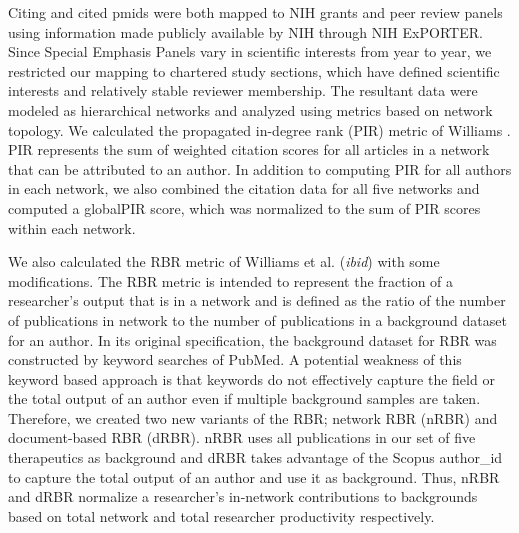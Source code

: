 \documentclass[10pt,letterpaper]{article}
\begin{document}
Citing and cited pmids were both mapped to NIH grants and peer review panels using information made publicly available by NIH through NIH ExPORTER. Since Special Emphasis Panels vary in scientific interests from year to year, we restricted our mapping to chartered study sections, which have defined scientific interests and relatively stable reviewer membership. The resultant data were modeled as hierarchical networks and analyzed using metrics based on network topology. We calculated the propagated in-degree rank (PIR) metric of Williams \cite {bib1}. PIR represents the sum of weighted citation scores for all articles in a network that can be attributed to an author. In addition to computing PIR for all authors in each network, we also combined the citation data for all five networks and computed a globalPIR score, which was normalized to the sum of PIR scores within each network.

We also calculated the RBR metric of Williams et al. (\textit{ibid}) with some modifications. The RBR metric is intended to represent the fraction of a researcher's output that is in a network and is defined as the ratio of the number of publications in network to the number of publications in a background dataset for an author. In its original specification, the background dataset for RBR was constructed by keyword searches of PubMed. A potential weakness of this keyword based approach is that keywords do not effectively capture the field or the total output of an author even if multiple background samples are taken. Therefore, we created two new variants of the RBR; network RBR (nRBR) and document-based RBR (dRBR). nRBR uses all publications in our set of five therapeutics as background and dRBR takes advantage of the Scopus author\_id to capture the total output of an author and use it as background. Thus, nRBR and dRBR normalize a researcher's in-network contributions to backgrounds based on total network and total researcher productivity respectively.\\
\vspace{2.5 mm}
\end{document}
